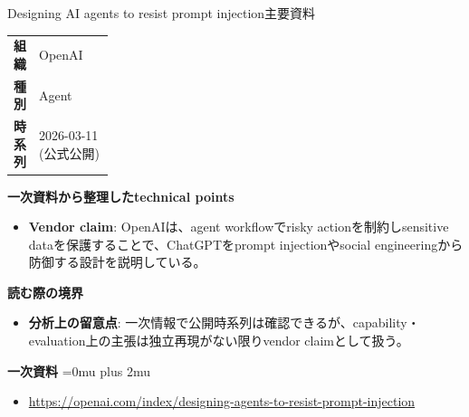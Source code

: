 \begin{technicalnote}{Designing AI agents to resist prompt injection}{主要資料}
\begingroup
\begin{tabularx}{\linewidth}{@{}>{\bfseries}p{0.22\linewidth}X@{}}
組織 & OpenAI \\
種別 & Agent \\
時系列 & 2026-03-11 (公式公開) \\
\end{tabularx}
\smallskip
{\bfseries 一次資料から整理したtechnical points}
\begin{itemize}[leftmargin=1.5em,itemsep=0.35em]
\item \textbf{Vendor claim}: OpenAIは、agent workflowでrisky actionを制約しsensitive dataを保護することで、ChatGPTをprompt injectionやsocial engineeringから防御する設計を説明している。
\end{itemize}
\begin{minipage}{\linewidth}
{\bfseries 読む際の境界}
\begin{itemize}[leftmargin=1.5em,itemsep=0.35em]
\item \textbf{分析上の留意点}: 一次情報で公開時系列は確認できるが、capability・evaluation上の主張は独立再現がない限りvendor claimとして扱う。
\end{itemize}
\begin{samepage}
{\bfseries 一次資料}
\begingroup\sloppy
\Urlmuskip=0mu plus 2mu\relax
\begin{itemize}[leftmargin=1.5em,itemsep=0.25em]
\item {\scriptsize\url{https://openai.com/index/designing-agents-to-resist-prompt-injection}}
\end{itemize}
\endgroup
\end{samepage}
\end{minipage}
\endgroup
\end{technicalnote}
\medskip

